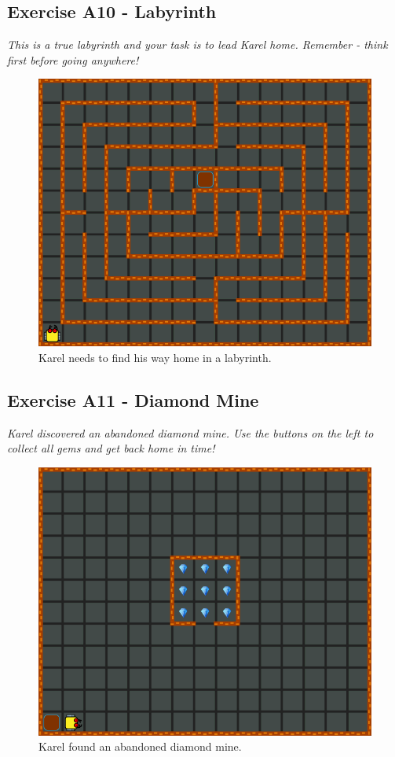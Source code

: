 \subsection{Exercise A10 - Labyrinth}

{\em This is a true labyrinth and your task is to lead Karel 
home. Remember - think first before going anywhere!}

\begin{figure}[!ht]
\begin{center}
\includegraphics[height=0.4\textwidth]{imgk/a10.png}
\end{center}
\vspace{-4mm}
\caption{Karel needs to find his way home in a labyrinth.}
\label{fig:a10}
\vspace{-4mm}
\end{figure}
\noindent


\subsection{Exercise A11 - Diamond Mine}

{\em Karel discovered an abandoned diamond mine. Use the buttons
on the left to collect all gems and get back home in time!}

\begin{figure}[!ht]
\begin{center}
\includegraphics[height=0.4\textwidth]{imgk/a11.png}
\end{center}
\vspace{-4mm}
\caption{Karel found an abandoned diamond mine.}
\label{fig:a11}
\vspace{-4mm}
\end{figure}
\noindent

